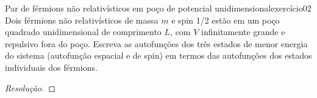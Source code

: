 \begin{exercício}{Par de férmions não relativísticos em poço de potencial unidimensional}{exercício02}
    Dois férmions não relativísticos de massa \(m\) e spin 1/2 estão em um poço quadrado unidimensional de comprimento \(L\), com \(V\) infinitamente grande e repulsivo fora do poço. Escreva as autofunções dos três estados de menor energia do sistema (autofunção espacial e de spin) em termos das autofunções dos estados individuais dos férmions.
\end{exercício}
\begin{proof}[Resolução]

\end{proof}

